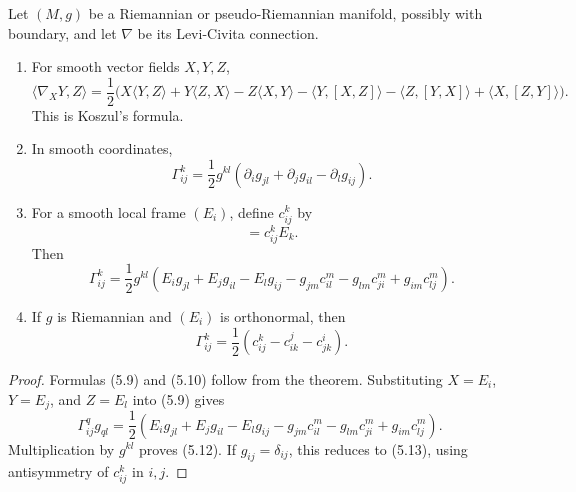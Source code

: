 \begin{corollary}
\label{cor:formulas-levi-civita-connection}

Let $(M,g)$ be a Riemannian or pseudo-Riemannian manifold, possibly with
boundary, and let $\nabla$ be its Levi-Civita connection.
\begin{enumerate}
\item[(a)] For smooth vector fields $X,Y,Z$,
\begin{equation}
\langle\nabla_XY,Z\rangle
=\frac12\bigl(X\langle Y,Z\rangle+Y\langle Z,X\rangle-Z\langle X,Y\rangle
-\langle Y,[X,Z]\rangle-\langle Z,[Y,X]\rangle
+\langle X,[Z,Y]\rangle\bigr).
\tag{5.9}
\end{equation}
This is Koszul's formula.
\item[(b)] In smooth coordinates,
\begin{equation}
\Gamma^k_{ij}
=\frac12g^{kl}(\partial_ig_{jl}+\partial_jg_{il}-\partial_lg_{ij}).
\tag{5.10}
\end{equation}
\item[(c)] For a smooth local frame $(E_i)$, define $c^k_{ij}$ by
\begin{equation}
[E_i,E_j]=c^k_{ij}E_k.
\tag{5.11}
\end{equation}
Then
\begin{equation}
\Gamma^k_{ij}
=\frac12g^{kl}\left(E_ig_{jl}+E_jg_{il}-E_lg_{ij}
-g_{jm}c^m_{il}-g_{lm}c^m_{ji}+g_{im}c^m_{lj}\right).
\tag{5.12}
\end{equation}
\item[(d)] If $g$ is Riemannian and $(E_i)$ is orthonormal, then
\begin{equation}
\Gamma^k_{ij}=\frac12(c^k_{ij}-c^j_{ik}-c^i_{jk}).
\tag{5.13}
\end{equation}
\end{enumerate}

\begin{proof}
\sketch Formulas (5.9) and (5.10) follow from the theorem. Substituting
$X=E_i$, $Y=E_j$, and $Z=E_l$ into (5.9) gives
\[
\Gamma^q_{ij}g_{ql}
=\frac12\left(E_ig_{jl}+E_jg_{il}-E_lg_{ij}
-g_{jm}c^m_{il}-g_{lm}c^m_{ji}+g_{im}c^m_{lj}\right).
\]
Multiplication by $g^{kl}$ proves (5.12). If $g_{ij}=\delta_{ij}$, this
reduces to (5.13), using antisymmetry of $c^k_{ij}$ in $i,j$.
\end{proof}
\end{corollary}


